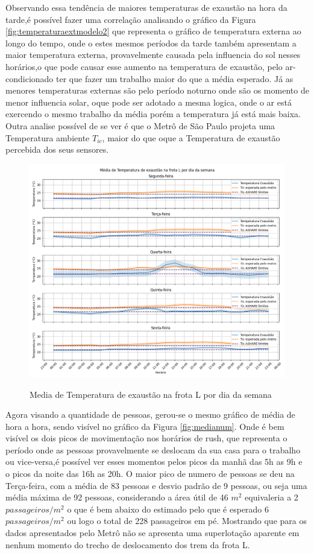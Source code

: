 \documentclass[acronym,symbols,table]{fei}
\begin{document}
Observando essa tendência de maiores temperaturas de exaustão na hora da tarde,é possível fazer uma correlação analisando o gráfico da Figura \ref{fig:temperaturaextmodelo2} que representa o gráfico de temperatura externa ao longo do tempo, onde o estes mesmos períodos da tarde também apresentam a maior temperatura externa, provavelmente causada pela influencia do sol nesses horários,o que pode causar esse aumento na temperatura de exaustão, pelo ar-condicionado ter que fazer um trabalho maior do que a média esperado. Já as menores temperaturas externas são pelo período noturno onde são os momento de menor influencia solar, oque pode ser adotado a mesma logica, onde o ar está exercendo o mesmo trabalho da média porém a temperatura já está mais baixa. Outra analise possível de se ver é que o Metrô de São Paulo projeta uma Temperatura ambiente ${T}_{ic}$, maior do que oque a Temperatura de exaustão percebida dos seus sensores.

\begin{figure}[!htb]
	\centering
	\caption{Media de Temperatura de exaustão na frota L por dia da semana}
    \includegraphics[width=0.8\linewidth]{Imagens/Media_de_Temperatura_de_exaustao_na_frota_L_por_dia_da_semana.png}
    \label{fig:mediatemp}
\end{figure}


Agora visando a quantidade de pessoas, gerou-se o mesmo gráfico de média de hora a hora, sendo visível no gráfico da Figura \ref{fig:medianum}. Onde é bem visível os dois picos de movimentação nos horários de rush, que representa o período onde as pessoas provavelmente se deslocam da sua casa para o trabalho ou vice-versa,é possível ver esses momentos pelos picos da manhã das 5h as 9h e o picos da noite das 16h as 20h. O maior pico de numero de pessoas se deu na Terça-feira, com a média de 83 pessoas e desvio padrão de 9 pessoas, ou seja uma média máxima de 92 pessoas, considerando a área útil de 46 $m^2$ equivaleria a 2 $passageiros/m^2$ o que é bem abaixo do estimado pelo \textcite{metrosp2024} que é esperado 6 $passageiros/m^2$ ou logo o total de 228 passageiros em pé. Mostrando que para os dados apresentados pelo Metrô não se apresenta uma superlotação aparente em nenhum momento do trecho de deslocamento dos trem da frota L. 
\end{document}
